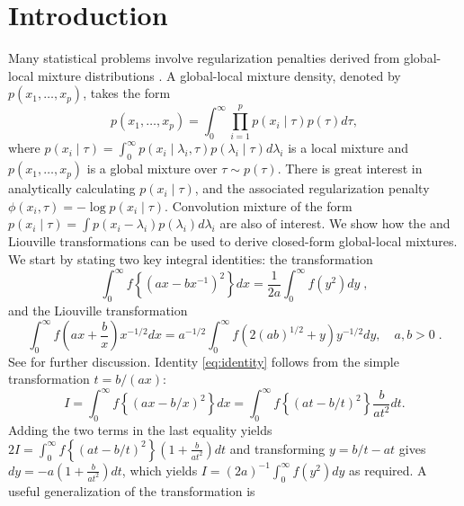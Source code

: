 \documentclass[lineno]{biometrika}
\begin{document}
\section{Introduction}
Many statistical problems involve regularization penalties derived from
global-local mixture distributions \citep{polson_data_2011,
hans2011comment,bhadra2015horseshoe+}. A global-local mixture density, denoted
by $p(x_1, \ldots, x_p)$, takes the form 
\begin{equation*}
  p(x_1, \ldots, x_p) = \int_{0}^{\infty}\prod_{i=1}^{p} p(x_i \mid \tau) 
  p(\tau) d\tau, 
\end{equation*}
where $p(x_i \mid \tau) = \int_{0}^{\infty} p(x_i \mid \lambda_i, \tau) p(\lambda_i \mid \tau) d\lambda_i$ is a local mixture and $p(x_1, \ldots, x_p)$ is a global mixture over $\tau \sim p(\tau)$. There is great interest in analytically calculating $p(x_i \mid \tau)$, and the associated regularization penalty $\phi(x_i, \tau) = -\log p(x_i \mid \tau)$.  Convolution mixture of the form $p(x_i \mid \tau) = \int p(x_i - \lambda_i) p(\lambda_i) d \lambda_i$ are also of interest. We show how the \CS{} and Liouville transformations can
be used to derive closed-form global-local mixtures.  We start by stating two key integral identities: 
the \CS{} transformation 
\begin{equation}
  \int_0^\infty f \left\{ ( a x - b x^{-1} )^2 \right\} d x 
  = \frac{1}{2a} \int_0^\infty f(y^2) d y
  \;, 
  \label{eq:identity}
\end{equation}
and the Liouville transformation
\begin{equation}
  \int_{0}^{\infty} f\left(ax + \frac{b}{x} \right) x^{-1/2}dx = a^{-1/2} \int_{0}^{\infty} f\left( 2 (ab)^{1/2} + y \right) y^{-1/2} dy, \quad a, b >0
  \;. 
  \label{eq:liouville}
\end{equation}
See \cite{boros2006irresistible, baker2008probabilistic, jones_generating_2014} for further discussion. Identity \eqref{eq:identity} follows from the simple transformation $t = b/(a x)$: 
\begin{equation*}
  I = \int_{0}^{\infty} f \left\{(ax - b/x)^2 \right\} dx = \int_{0}^{\infty} f \left\{(at - b/t)^2 \right\} \frac{b}{a t^2} dt.
\end{equation*}
Adding the two terms in the last equality yields $2 I = \int_{0}^{\infty} f \left\{(at - b/t)^2 \right\} \left( 1+\frac{b}{a t^2} \right) dt$ and transforming $y = b/t - at$ gives $dy = -a (1+\frac{b}{a t^2}) dt$, which yields $I = (2a)^{-1} \int_{0}^{\infty} f(y^2) dy$ as required. A useful generalization of the \CS{} transformation is
\end{document}
